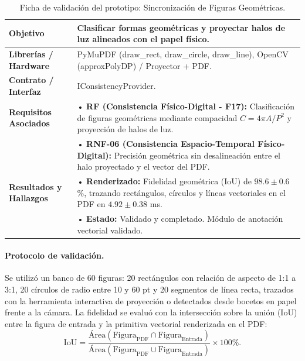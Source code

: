 \begin{table}[H]
    \centering
    \caption{Ficha de validación del prototipo: Sincronización de Figuras Geométricas.}
    \label{tab:ficha_f17}
    \begin{tabular}{|L{3.2cm}|L{11.0cm}|}
        \hline
        \textbf{Objetivo} & Clasificar formas geométricas y proyectar halos de luz alineados con el papel físico. \\ \hline
        \textbf{Librerías / Hardware} & PyMuPDF (draw\_rect, draw\_circle, draw\_line), OpenCV (approxPolyDP) / Proyector + PDF. \\ \hline
        \textbf{Contrato / Interfaz} & IConsistencyProvider. \\ \hline
        \textbf{Requisitos Asociados} &
        • \textbf{RF (Consistencia Físico-Digital - F17):} Clasificación de figuras geométricas mediante compacidad $C = 4\pi A / P^{2}$ y proyección de halos de luz. \vspace{0.1cm} \\
        & • \textbf{RNF-06 (Consistencia Espacio-Temporal Físico-Digital):} Precisión geométrica sin desalineación entre el halo proyectado y el vector del PDF. \\ \hline
        \textbf{Resultados y Hallazgos} &
        • \textbf{Renderizado:} Fidelidad geométrica (IoU) de $98.6 \pm 0.6$\%, trazando rectángulos, círculos y líneas vectoriales en el PDF en $4.92 \pm 0.38$ ms. \vspace{0.1cm} \\
        & • \textbf{Estado:} Validado y completado. Módulo de anotación vectorial validado. \\ \hline
    \end{tabular}
\end{table}
 
\paragraph{Protocolo de validación.} Se utilizó un banco de 60 figuras: 20 rectángulos con relación de aspecto de 1:1 a 3:1, 20 círculos de radio entre 10 y 60 pt y 20 segmentos de línea recta, trazados con la herramienta interactiva de proyección o detectados desde bocetos en papel frente a la cámara. La fidelidad se evaluó con la intersección sobre la unión (IoU) entre la figura de entrada y la primitiva vectorial renderizada en el PDF:
\[ \mathrm{IoU} = \frac{\mathrm{Área}(\mathrm{Figura}_{\mathrm{PDF}} \cap \mathrm{Figura}_{\mathrm{Entrada}})}{\mathrm{Área}(\mathrm{Figura}_{\mathrm{PDF}} \cup \mathrm{Figura}_{\mathrm{Entrada}})} \times 100\%. \]
 

